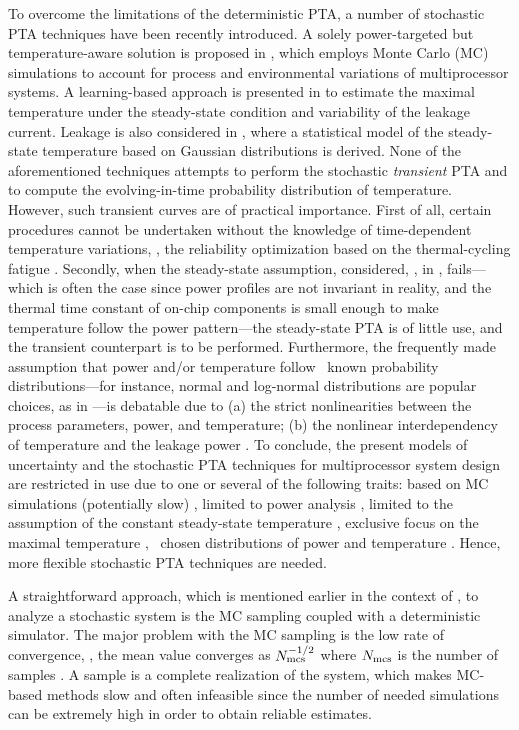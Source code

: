 To overcome the limitations of the deterministic PTA, a number of stochastic PTA techniques have been recently introduced. A solely power-targeted but temperature-aware solution is proposed in \cite{chandra2010}, which employs Monte Carlo (MC) simulations to account for process and environmental variations of multiprocessor systems. A learning-based approach is presented in \cite{juan2011} to estimate the maximal temperature under the steady-state condition and variability of the leakage current. Leakage is also considered in \cite{juan2012}, where a statistical model of the steady-state temperature based on Gaussian distributions is derived. None of the aforementioned techniques attempts to perform the stochastic \emph{transient} PTA and to compute the evolving-in-time probability distribution of temperature. However, such transient curves are of practical importance. First of all, certain procedures cannot be undertaken without the knowledge of time-dependent temperature variations, \eg, the reliability optimization based on the thermal-cycling fatigue \cite{ukhov2012}. Secondly, when the steady-state assumption, considered, \eg, in \cite{juan2011, juan2012}, fails---which is often the case since power profiles are not invariant in reality, and the thermal time constant of on-chip components is small enough to make temperature follow the power pattern---the steady-state PTA is of little use, and the transient counterpart is to be performed. Furthermore, the frequently made assumption that power and/or temperature follow \apriori\ known probability distributions---for instance, normal and log-normal distributions are popular choices, as in \cite{juan2012, srivastava2010}---is debatable due to (a) the strict nonlinearities between the process parameters, power, and temperature; (b) the nonlinear interdependency of temperature and the leakage power \cite{liu2007}. To conclude, the present models of uncertainty and the stochastic PTA techniques for multiprocessor system design are restricted in use due to one or several of the following traits: based on MC simulations (potentially slow) \cite{chandra2010}, limited to power analysis \cite{chandra2010}, limited to the assumption of the constant steady-state temperature \cite{juan2011, juan2012}, exclusive focus on the maximal temperature \cite{juan2011}, \apriori\ chosen distributions of power and temperature \cite{juan2012, srivastava2010}. Hence, more flexible stochastic PTA techniques are needed.

A straightforward approach, which is mentioned earlier in the context of \cite{chandra2010}, to analyze a stochastic system is the MC sampling coupled with a deterministic simulator. The major problem with the MC sampling is the low rate of convergence, \eg, the mean value converges as $N_\text{mcs}^{-{{1}/{2}}}$ where $N_\text{mcs}$ is the number of samples \cite{xiu2010, maitre2010}. A sample is a complete realization of the system, which makes MC-based methods slow and often infeasible since the number of needed simulations can be extremely high in order to obtain reliable estimates.

